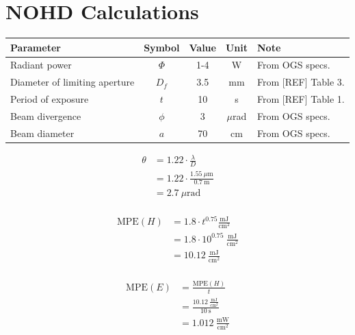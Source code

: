 \documentclass[a4paper]{article}
\begin{document}
\section*{NOHD Calculations}

\begin{table}[]
\begin{tabular}{lcccl}
\hline
Parameter                     & Symbol & Value & Unit     & Note                    \\ \hline
Radiant power                 & $\Phi$ & 1-4     & W        & From OGS specs.         \\
Diameter of limiting aperture & $D_f$  & 3.5   & mm       & From {[}REF{]} Table 3. \\
Period of exposure            & $t$    & 10    & s        & From {[}REF{]} Table 1. \\
Beam divergence               & $\phi$ & 3     & $\mu$rad & From OGS specs.         \\
Beam diameter                 & $a$    & 70    & cm       & From OGS specs.         \\ \hline
\end{tabular}
\end{table}

\begin{align*}
\theta &= 1.22\cdot \frac{\lambda}{D}\\
	&= 1.22\cdot\frac{1.55\ \mu\textrm{m}}{0.7\ \textrm{m}}\\
	&= 2.7\ \mu\textrm{rad}\\
\end{align*}


\begin{align*}
\textrm{MPE}(H) &= 1.8\cdot t^{0.75} \frac{\textrm{mJ}}{\textrm{cm}^2}\\
&= 1.8\cdot 10^{0.75}  \ \frac{\textrm{mJ}}{\textrm{cm}^2}\\
&= 10.12 \ \frac{\textrm{mJ}}{\textrm{cm}^2} \\
\end{align*}

\begin{align*}
\textrm{MPE}(E) &= \frac{\textrm{MPE}(H)}{t} \\
   &= \frac{10.12 \ \frac{\textrm{mJ}}{\textrm{cm}^2}}{10 \ \textrm{s}}\\
   &= 1.012 \ \frac{\textrm{mW}}{\textrm{cm}^2} \\
\end{align*}
\end{document}
